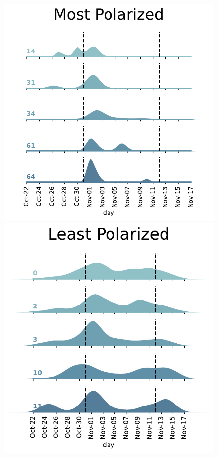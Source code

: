 \begin{figure}[H]
    \centering
    \begin{minipage}{0.50\textwidth}
        \centering
         \includegraphics[width=0.98\linewidth]{Chapter5/figures/ridge_most.pdf}
        
    \end{minipage}\hfill
    \begin{minipage}{0.50\textwidth}
        \centering
         \includegraphics[width=0.98\linewidth]{Chapter5/figures/ridge_least.pdf}
        

\end{minipage}
\end{figure}
